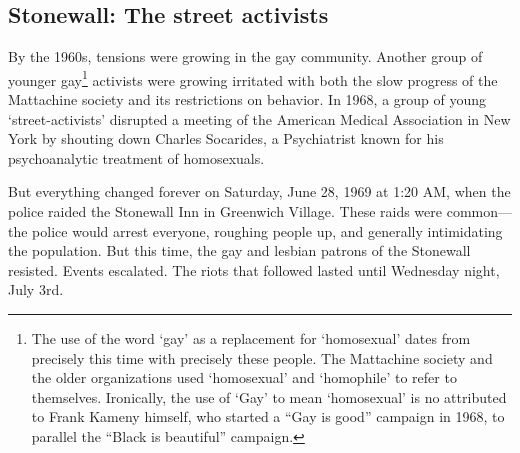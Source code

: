 \begin{refsection}
\subsection{Stonewall: The street activists}
\label{stonewall:thestreetactivists}

By the 1960s, tensions were growing in the gay community. Another group of younger gay\footnote{The use of the word `gay' as a replacement for `homosexual' dates from precisely this time with precisely these people. The Mattachine society and the older organizations used `homosexual' and `homophile' to refer to themselves. Ironically, the use of `Gay' to mean `homosexual' is no attributed to Frank Kameny himself, who started a ``Gay is good'' campaign in 1968, to parallel the ``Black is beautiful'' campaign.} activists were growing irritated with both the slow progress of the Mattachine society and its restrictions on behavior. In 1968, a group of young `street-activists' disrupted a meeting of the American Medical Association in New York by shouting down Charles Socarides, a Psychiatrist known for his psychoanalytic treatment of homosexuals.

But everything changed forever on Saturday, June 28, 1969 at 1:20 AM, when the police raided the Stonewall Inn in Greenwich Village. These raids were common---the police would arrest everyone, roughing people up, and generally intimidating the population. But this time, the gay and lesbian patrons of the Stonewall resisted. Events escalated. The riots that followed lasted until Wednesday night, July 3rd. 
\begin{marginfigure}
 \begin{center}


\end{center}
\end{marginfigure}
\end{refsection}
